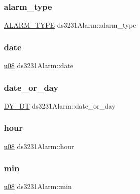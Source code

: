 \subsubsection{\texorpdfstring{alarm\+\_\+type}{alarm\_type}}
{\footnotesize\ttfamily \hyperlink{DS3231__stm32__hal_8h_a7d33379f6dff123738a82d85ea2b876a}{A\+L\+A\+R\+M\+\_\+\+T\+Y\+PE} ds3231\+Alarm\+::alarm\+\_\+type}

\mbox{\label{structds3231Alarm_aecf62d17878445c9e55ad2504d506d98}} 
\subsubsection{\texorpdfstring{date}{date}}
{\footnotesize\ttfamily \hyperlink{main_8h_ae2b6b8613a28b013c8c7fdaf93cdb1e1}{u08} ds3231\+Alarm\+::date}

\mbox{\label{structds3231Alarm_a2b3c65f1eeff84a05e4ac80af4d844d3}} 
\subsubsection{\texorpdfstring{date\+\_\+or\+\_\+day}{date\_or\_day}}
{\footnotesize\ttfamily \hyperlink{DS3231__stm32__hal_8h_af98f0d3260c36c79a1457ac2acde6f13}{D\+Y\+\_\+\+DT} ds3231\+Alarm\+::date\+\_\+or\+\_\+day}

\mbox{\label{structds3231Alarm_a7e9a65a7c3ab95487b1aafab5f4367e9}} 
\subsubsection{\texorpdfstring{hour}{hour}}
{\footnotesize\ttfamily \hyperlink{main_8h_ae2b6b8613a28b013c8c7fdaf93cdb1e1}{u08} ds3231\+Alarm\+::hour}

\mbox{\label{structds3231Alarm_a39c40bbf0330038f7a0c4e4604e64f6a}} 
\subsubsection{\texorpdfstring{min}{min}}
{\footnotesize\ttfamily \hyperlink{main_8h_ae2b6b8613a28b013c8c7fdaf93cdb1e1}{u08} ds3231\+Alarm\+::min}

